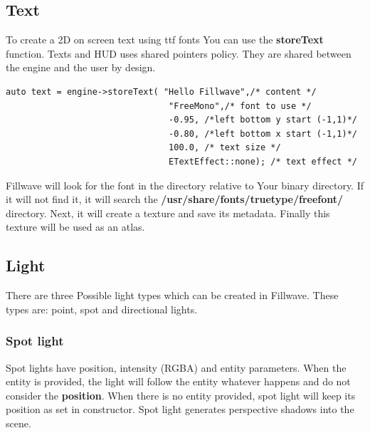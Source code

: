 \documentclass{article}
\begin{document}
\subsection{Text}\label{sec:Text}
\indent \indent To create a 2D on screen text using ttf fonts You can use the \textbf{storeText} function. Texts and HUD uses shared pointers policy. They are shared between the engine and the user by design.

\begin{lstlisting}
auto text = engine->storeText( "Hello Fillwave",/* content */
                                "FreeMono",/* font to use */
                                -0.95, /*left bottom y start (-1,1)*/    
                                -0.80, /*left bottom x start (-1,1)*/     
                                100.0, /* text size */
                                ETextEffect::none); /* text effect */
\end{lstlisting}

\indent \indent Fillwave will look for the font in the directory relative to Your binary directory. If it will not find it, it will search the \textbf{/usr/share/fonts/truetype/freefont/} directory. Next, it will create a texture and save its metadata. Finally this texture will be used as an atlas.

\subsection{Light}\label{sec:Light}
\indent \indent There are three Possible light types which can be created in Fillwave. These types are: point, spot and directional lights.


\subsubsection{Spot light}\label{sec:Spot light}
\indent \indent Spot lights have position, intensity (RGBA) and entity parameters. When the entity is provided, the light will follow the entity whatever happens and do not consider the \textbf{position}. When there is no entity provided, spot light will keep its position as set in constructor. Spot light generates perspective shadows into the scene.
\end{document}
